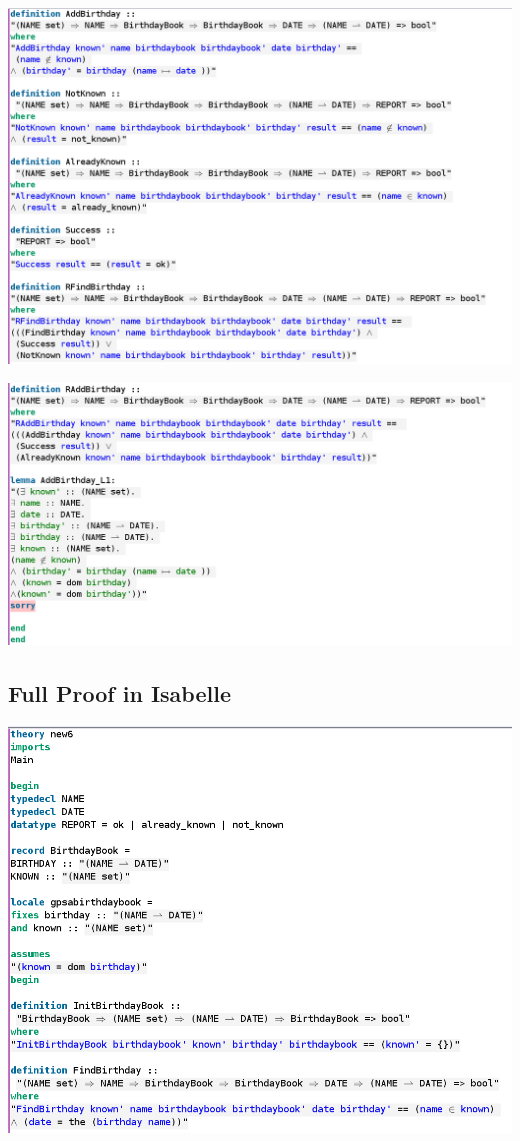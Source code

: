 \noindent \includegraphics[scale=0.4]{examples/bb/5imageb.png}

\noindent \includegraphics[scale=0.4]{examples/bb/5imagec.png}
%
%
\subsection{Full Proof in Isabelle}
\label{app:bb6}
\includegraphics[scale=0.4]{examples/bb/6imagea.png}

